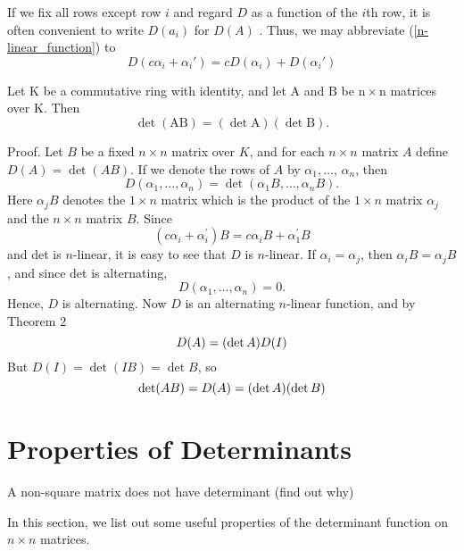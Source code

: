 \documentclass[main.tex]{subfiles}
\begin{document}
If we fix all rows except row $i$ and regard $D$ as a function of the $i$th row, it is often convenient to write $D(a_i)$ for $D(A)$ . Thus, we may abbreviate (\ref{n-linear_function}) to
\begin{equation*}
D(c\alpha_i + \alpha_i') = cD(\alpha_i) + D(\alpha_i')
\end{equation*}

\begin{theorem}Let $\mathrm{K}$ be a commutative ring with identity, and let $\mathrm{A}$ and $\mathrm{B}$ be $\mathrm{n} \times \mathrm{n}$ matrices over $\mathrm{K}$. Then
$$
\operatorname{det}(\mathrm{AB})=(\operatorname{det} \mathrm{A})(\operatorname{det} \mathrm{B}).
$$
\end{theorem}
Proof. Let $B$ be a fixed $n \times n$ matrix over $K$, and for each $n \times n$ matrix $A$ define $D(A)=\operatorname{det}(A B)$. If we denote the rows of $A$ by $\alpha_1, \ldots$, $\alpha_n$, then
$$
D\left(\alpha_1, \ldots, \alpha_n\right)=\operatorname{det}\left(\alpha_1 B, \ldots, \alpha_n B\right) .
$$
Here $\alpha_j B$ denotes the $1 \times n$ matrix which is the product of the $1 \times n$ matrix $\alpha_j$ and the $n \times n$ matrix $B$. Since
$$
\left(c \alpha_i+\alpha_i^{\prime}\right) B=c \alpha_i B+\alpha_1^{\prime} B
$$
and det is $n$-linear, it is easy to see that $D$ is $n$-linear. If $\alpha_i=\alpha_j$, then $\alpha_i B=\alpha_j B$, and since det is alternating,
$$
D\left(\alpha_1, \ldots, \alpha_n\right)=0 .
$$
Hence, $D$ is alternating. Now $D$ is an alternating $n$-linear function, and by Theorem 2
$$
D(A)=(\operatorname{det} A) D(I) \\
$$
But $D(I)=\operatorname{det}(I B)=\operatorname{det} B$, so
$$
\operatorname{det}(A B)=D(A)=(\operatorname{det} A)(\operatorname{det} B)\\
$$


\section{Properties of Determinants}
\begin{note}
A non-square matrix does not have determinant (find out why)
\end{note}


In this section, we list out some useful properties of the determinant function on $n \times n $ matrices. 
\end{document}

